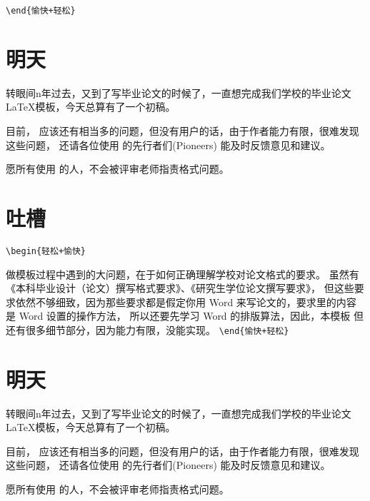 \verb!\end{愉快+轻松}!

\section{明天}

转眼间n年过去，又到了写毕业论文的时候了，一直想完成我们学校的毕业论文\LaTeX{}模板，今天总算有了一个初稿。

目前， \nwafuthesis{} 应该还有相当多的问题，但没有用户的话，由于作者能力有限，很难发现这些问题，
还请各位使用 \nwafuthesis{} 的先行者们(Pioneers) 能及时反馈意见和建议。

愿所有使用 \nwafuthesis{} 的人，不会被评审老师指责格式问题。

\section{吐槽}

\verb!\begin{轻松+愉快}!

做模板过程中遇到的大问题，在于如何正确理解学校对论文格式的要求。
虽然有《本科毕业设计（论文）撰写格式要求》、《研究生学位论文撰写要求》，
但这些要求依然不够细致，因为那些要求都是假定你用 Word 来写论文的，要求里的内容是 Word 设置的操作方法，
所以还要先学习 Word 的排版算法，因此，本模板
但还有很多细节部分，因为能力有限，没能实现。
\verb!\end{愉快+轻松}!

\section{明天}

转眼间n年过去，又到了写毕业论文的时候了，一直想完成我们学校的毕业论文\LaTeX{}模板，今天总算有了一个初稿。

目前， \nwafuthesis{} 应该还有相当多的问题，但没有用户的话，由于作者能力有限，很难发现这些问题，
还请各位使用 \nwafuthesis{} 的先行者们(Pioneers) 能及时反馈意见和建议。

愿所有使用 \nwafuthesis{} 的人，不会被评审老师指责格式问题。


